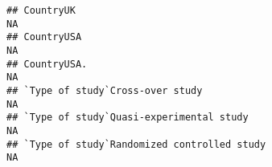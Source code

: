 \documentclass[]{article}
\begin{document}
\begin{verbatim}
## CountryUK                                                                                                                                                                                                                                                                                                                                                                                                                                                                             NA
## CountryUSA                                                                                                                                                                                                                                                                                                                                                                                                                                                                            NA
## CountryUSA.                                                                                                                                                                                                                                                                                                                                                                                                                                                                           NA
## `Type of study`Cross-over study                                                                                                                                                                                                                                                                                                                                                                                                                                                       NA
## `Type of study`Quasi-experimental study                                                                                                                                                                                                                                                                                                                                                                                                                                               NA
## `Type of study`Randomized controlled study                                                                                                                                                                                                                                                                                                                                                                                                                                            NA

\end{verbatim}
\end{document}
